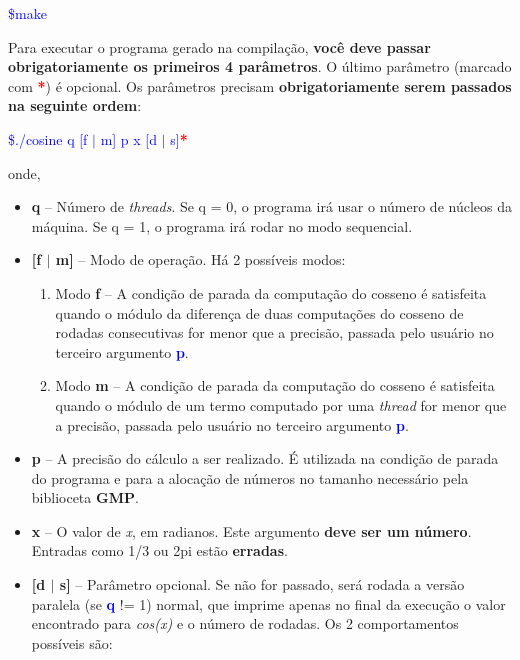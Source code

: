 \documentclass[11pt]{article}
\begin{document}
\begin{flushleft}
\textcolor{blue}{\$make}
\end{flushleft}

\noindent Para executar o programa gerado na compilação, \textbf{você deve passar obrigatoriamente os primeiros 4 parâmetros}. O último parâmetro (marcado com \textbf{\textcolor{red}{*}}) é opcional. Os parâmetros precisam \textbf{obrigatoriamente serem passados na seguinte ordem}: 

\begin{flushleft}
\textcolor{blue}{\$./cosine q [f $|$ m] p x [d $|$ s]}\textbf{\textcolor{red}{*}}

onde, 
\end{flushleft}
\begin{itemize}
\item \textbf{q} -- Número de \textit{threads}. Se q = 0, o programa irá usar o número de núcleos da máquina. Se q = 1, o programa irá rodar no modo sequencial.
\item \textbf{[f $|$ m]} -- Modo de operação. Há 2 possíveis modos:
	\begin{enumerate}
	\item Modo \textbf{f} -- A condição de parada da computação do cosseno é satisfeita quando o módulo da diferença de duas computações do cosseno de rodadas consecutivas for menor que a precisão, passada pelo usuário no terceiro argumento \textbf{\textcolor{blue}{p}}.
	\item Modo \textbf{m} -- A condição de parada da computação do cosseno é satisfeita quando o módulo de um termo computado por uma \textit{thread} for menor que a precisão, passada pelo usuário no terceiro argumento \textbf{\textcolor{blue}{p}}.
	\end{enumerate}
\item \textbf{p} -- A precisão do cálculo a ser realizado. É utilizada na condição de parada do programa e para a alocação de números no tamanho necessário pela biblioceta \textbf{GMP}.
\item \textbf{x} -- O valor de \textit{x}, em radianos. Este argumento \textbf{deve ser um número}. Entradas como 1/3 ou 2pi estão \textbf{erradas}.
\item \textbf{[d $|$ s]} -- Parâmetro opcional. Se não for passado, será rodada a versão paralela (se \textbf{\textcolor{blue}{q}} != 1) normal, que imprime apenas no final da execução o valor encontrado para \textit{cos(x)} e o número de rodadas. Os 2 comportamentos possíveis são:
	\begin{enumerate}

\end{enumerate}
\end{itemize}
\end{document}
